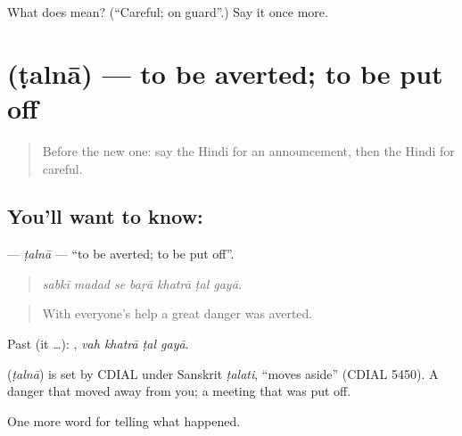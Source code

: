 \begin{tcolorbox}[breakable,colback=teal!4,colframe=teal!35!black,title={Before you move on}]
What does  mean? (\textquotedblleft{}Careful; on guard\textquotedblright{}.) Say it once more.
\end{tcolorbox}
\section[\texorpdfstring{\hi{टलना} (ṭalnā)}{टलना (ṭalnā)}]{ (ṭalnā) — to be averted; to be put off}

\label{lesson:HI-C302-ttalna}



\begin{quote}
Before the new one: say the Hindi for an announcement, then the Hindi for careful.
\end{quote}

\subsection*{You'll want to know: }
\textbf{} — \emph{ṭalnā} — \textquotedblleft{}to be averted; to be put off\textquotedblright{}.

\begin{quote}
      
\end{quote}

\begin{quote}
\emph{sabkī madad se baṛā khatrā ṭal gayā.}
\end{quote}

\begin{quote}
With everyone's help a great danger was averted.
\end{quote}

Past (it …):    , \emph{vah khatrā ṭal gayā}.

\begin{cousinweb}
\textbf{} (\emph{ṭalnā}) is set by CDIAL under Sanskrit \emph{ṭalati}, \textquotedblleft{}moves aside\textquotedblright{} (CDIAL 5450). A danger that \textbf{ } moved away from you; a meeting that \textbf{ } was put off.
\end{cousinweb}

\begin{grammarlens}[title={What you've built}]
One more word for telling what happened.
\end{grammarlens}


